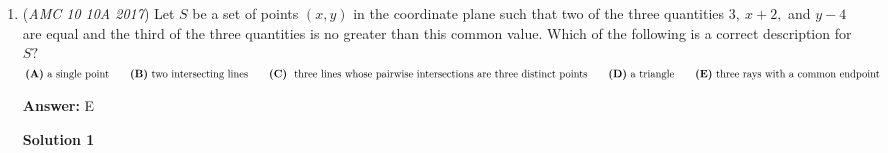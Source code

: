 \begin{enumerate}
\textbf{Solution 1}

In order to solve this problem, we must first visualize what the region looks like. We know that, in a three dimensional space, the region consisting of all points within $3$ units of a point would be a sphere with radius $3$.  However, we need to find the region containing all points within $3$ units of a segment.  It can be seen that our region is a cylinder with two hemispheres/endcaps on either end.  We know the volume of our region, so we set up the following equation (the volume of our cylinder + the volume of our two hemispheres will equal $216 \pi$):

 $\frac{4 \pi }{3} \cdot 3^3+9 \pi x=216 \pi$, where $x$ is equal to the length of our line segment.

 Solving, we find that $x = \boxed{\textbf{(D)}\ 20}$.

 



\textbf{Solution 2}

Because this is just a cylinder and $2$ hemispheres ("half spheres"), and the radius is $3$, the volume of the $2$ hemispheres is $\frac{4(3^3)\pi}{3} = 36 \pi$. Since we also know that the volume of this whole thing is $216 \pi$, we do $216 \pi-36 \pi$ to get $180 \pi$ as the volume of the cylinder. Thus the height is $180 \pi$ divided by the area of the base, or $\frac{180 \pi}{9\pi}=20$, so our answer is $\boxed{\textbf{(D)}\ 20}.$

 \textbf{Diagram for Solution} \href{https://artofproblemsolving.comhttp://i.imgur.com/cwNt293.png}{http://i.imgur.com/cwNt293.png}

 


	\item (\textit{AMC 10 10A 2017}) Let $S$ be a set of points $(x,y)$ in the coordinate plane such that two of the three quantities $3,~x+2,$ and $y-4$ are equal and the third of the three quantities is no greater than this common value. Which of the following is a correct description for $S?$
$\textbf{(A)}\ \text{a single point} \qquad\textbf{(B)}\ \text{two intersecting lines} \\\qquad\textbf{(C)}\ \text{ three lines whose pairwise intersections are three distinct points} \\\qquad\textbf{(D)}\ \text{a triangle} \qquad\textbf{(E)}\ \text{three rays with a common endpoint}$

 \textbf{Answer: }E



\textbf{Solution 1}


\end{enumerate}
